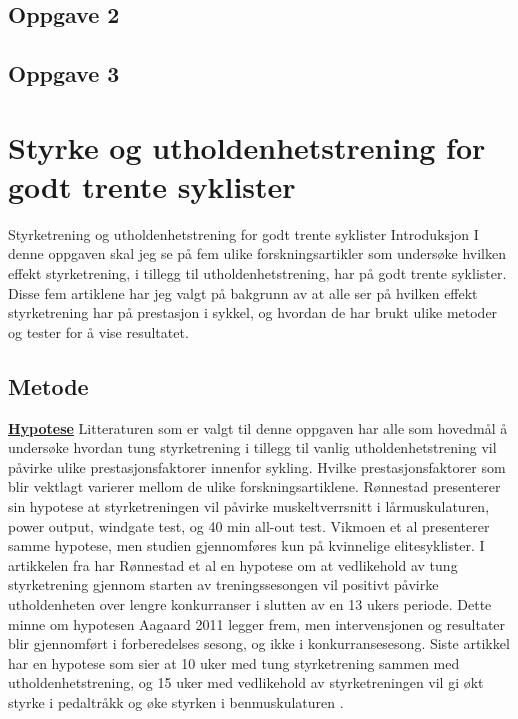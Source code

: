 \documentclass[
]{book}
\begin{document}
\hypertarget{oppgave-2}{%
\section{Oppgave 2}\label{oppgave-2}}

\hypertarget{oppgave-3}{%
\section{Oppgave 3}\label{oppgave-3}}

\hypertarget{styrke-og-utholdenhetstrening-for-godt-trente-syklister}{%
\chapter{Styrke og utholdenhetstrening for godt trente syklister}\label{styrke-og-utholdenhetstrening-for-godt-trente-syklister}}

Styrketrening og utholdenhetstrening for godt trente syklister Introduksjon I denne oppgaven skal jeg se på fem ulike forskningsartikler som undersøke hvilken effekt styrketrening, i tillegg til utholdenhetstrening, har på godt trente syklister. Disse fem artiklene har jeg valgt på bakgrunn av at alle ser på hvilken effekt styrketrening har på prestasjon i sykkel, og hvordan de har brukt ulike metoder og tester for å vise resultatet.

\hypertarget{metode-1}{%
\section{Metode}\label{metode-1}}

\underline{\textbf{Hypotese}} Litteraturen som er valgt til denne oppgaven har alle som hovedmål å undersøke hvordan tung styrketrening i tillegg til vanlig utholdenhetstrening vil påvirke ulike prestasjonsfaktorer innenfor sykling. Hvilke prestasjonsfaktorer som blir vektlagt varierer mellom de ulike forskningsartiklene. Rønnestad \citep{rønnestad2010b} presenterer sin hypotese at styrketreningen vil påvirke muskeltverrsnitt i lårmuskulaturen, power output, windgate test, og 40 min all-out test. Vikmoen et al \citep{vikmoen2016} presenterer samme hypotese, men studien gjennomføres kun på kvinnelige elitesyklister. I artikkelen fra \citep{rønnestad2010a} har Rønnestad et al en hypotese om at vedlikehold av tung styrketrening gjennom starten av treningssesongen vil positivt påvirke utholdenheten over lengre konkurranser i slutten av en 13 ukers periode. Dette minne om hypotesen Aagaard 2011 legger frem, men intervensjonen og resultater blir gjennomført i forberedelses sesong, og ikke i konkurransesesong. Siste artikkel har en hypotese som sier at 10 uker med tung styrketrening sammen med utholdenhetstrening, og 15 uker med vedlikehold av styrketreningen vil gi økt styrke i pedaltråkk og øke styrken i benmuskulaturen \citep{rønnestad2015}.
\end{document}
